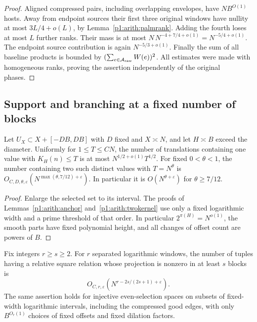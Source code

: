 \begin{proof}
Aligned compressed pairs, including overlapping envelopes, have
$NB^{O(1)}$ hosts.  Away from endpoint sources their first three original
windows have nullity at most $3L/4+o(L)$, by
Lemma~\ref{p1:arith:palmrank}.  Adding the fourth loses at most $L$
further ranks.  Their mass is at most
$N\,N^{-4+7/4+o(1)}=N^{-5/4+o(1)}$.
The endpoint source contribution is again $N^{-5/3+o(1)}$.
Finally the sum of all baseline products is bounded by
$(\sum_{e\in\mathcal A_{\rm raw}}W(e))^2$.
All estimates were made with homogeneous ranks, proving the assertion
independently of the original phases.
\end{proof}

\subsection{Support and branching at a fixed number of blocks}

\begin{lemma}
\label{p1:arith:small-kernels}
Let $U_X\subset X+[-DB,DB]$ with $D$ fixed and $X\asymp N$, and let
$H\asymp B$ exceed the diameter.  Uniformly for $1\leq T\leq CN$,
the number of translations containing one value with $K_H(n)\leq T$
is at most $N^{1/2+o(1)}T^{1/2}$.  For fixed $0<\theta<1$, the number
containing two such distinct values with $T=N^\theta$ is
$O_{C,D,\theta,\varepsilon}(N^{\max(\theta,7/12)+\varepsilon})$.
In particular it is $O(N^{\theta+\varepsilon})$ for $\theta\geq7/12$.
\end{lemma}

\begin{proof}
Enlarge the selected set to its interval.  The proofs of
Lemmas~\ref{p1:arith:anchor} and~\ref{p1:arith:twokernel} use only a
fixed logarithmic width and a prime threshold of that order.  In particular
$2^{\pi(H)}=N^{o(1)}$, the smooth parts have fixed polynomial height,
and all changes of offset count are powers of $B$.
\end{proof}

\begin{proposition}
\label{p1:arith:fixed-support}
Fix integers $r\geq s\geq2$.  For $r$ separated logarithmic windows,
the number of tuples having a relative square relation whose projection
is nonzero in at least $s$ blocks is
\[
 O_{C,r,\varepsilon}\left(N^{r-2s/(2s+1)+\varepsilon}\right).
\]
The same assertion holds for injective even-selection spaces on subsets
of fixed-width logarithmic intervals, including the compressed good edges,
with only $B^{O_r(1)}$ choices of fixed offsets and fixed dilation factors.
\end{proposition}

